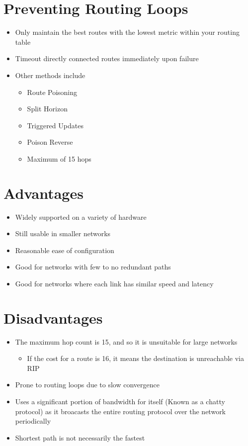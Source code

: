 \section*{Preventing Routing Loops}

\begin{itemize}
  \item Only maintain the best routes with the lowest metric within your routing table
  \item Timeout directly connected routes immediately upon failure
  \item Other methods include
  \begin{itemize}
    \item Route Poisoning
    \item Split Horizon
    \item Triggered Updates
    \item Poison Reverse
    \item Maximum of 15 hops
  \end{itemize}
\end{itemize}

\section*{Advantages}

\begin{itemize}
  \item Widely supported on a variety of hardware
  \item Still usable in smaller networks
  \item Reasonable ease of configuration
  \item Good for networks with few to no redundant paths
  \item Good for networks where each link has similar speed and latency
\end{itemize}

\section*{Disadvantages}

\begin{itemize}
  \item The maximum hop count is 15, and so it is unsuitable for large networks
  \begin{itemize}
    \item If the cost for a route is 16, it means the destination is unreachable via RIP
  \end{itemize}
  \item Prone to routing loops due to slow convergence
  \item Uses a significant portion of bandwidth for itself (Known as a chatty protocol) as it broacasts the entire routing protocol over the network periodically
  \item Shortest path is not necessarily the fastest
\end{itemize}

